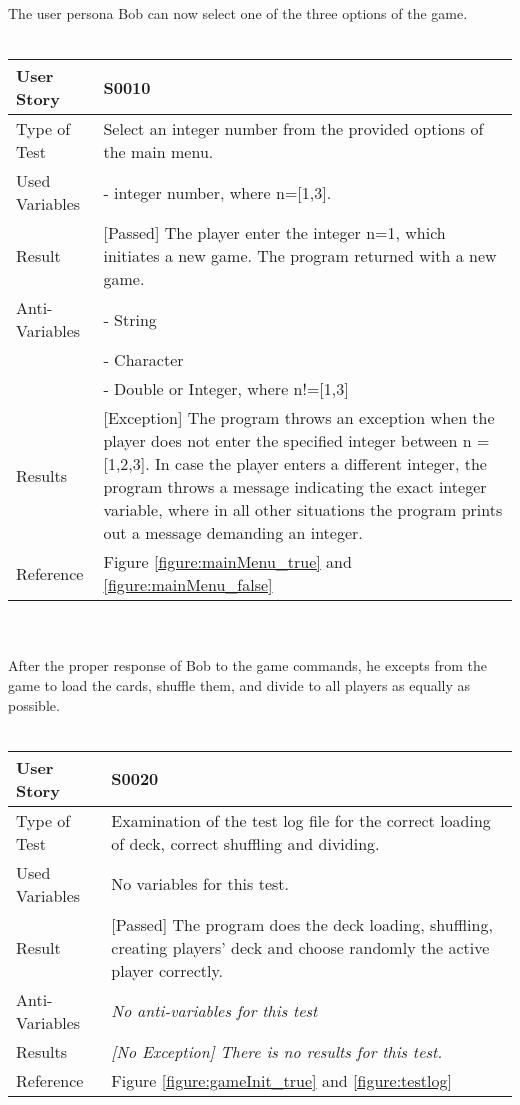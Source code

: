 The user persona Bob can now select one of the three options of the game.\\
\vspace{0.2cm}\\
\begin{tabular}{l | p{12cm}}
User Story & \textbf{S0010}\\ \hline
Type of Test & Select an integer number from the provided options of the main menu.\\ \hline
Used Variables & - integer number, where n=[1,3].\\ \hline
Result & [Passed] The player enter the integer n=1, which initiates a new game. The program returned with a new game.\\ \hline
Anti-Variables & - String\\
& - Character\\
& - Double or Integer, where n!=[1,3]\\
\hline
Results & [Exception] The program throws an exception when the player does not enter the specified integer between n = [1,2,3]. In case the player enters a different integer, the program throws a message indicating the exact integer variable, where in all other situations the program prints out a message demanding an integer.\\ \hline 
Reference & Figure \ref{figure:mainMenu_true} and \ref{figure:mainMenu_false}\\ \hline
\end{tabular}\\
\vspace{0.2cm}\\
After the proper response of Bob to the game commands, he excepts from the game to load the cards, shuffle them, and divide to all players as equally as possible.\\
\vspace{0.2cm}\\
\begin{tabular}{l | p{12cm}}
User Story & \textbf{S0020}\\ \hline
Type of Test & Examination of the test log file for the correct loading of deck, correct shuffling and dividing.\\ \hline
Used Variables & No variables for this test.\\ \hline
Result & [Passed] The program does the deck loading, shuffling, creating players' deck and choose randomly the active player correctly. \\ \hline
Anti-Variables & \textit{No anti-variables for this test} \\ \hline
Results & \textit{[No Exception] There is no results for this test.} \\ \hline
Reference & Figure \ref{figure:gameInit_true} and \ref{figure:testlog}\\ \hline
\end{tabular}\\
